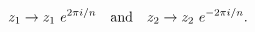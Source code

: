 \begin{equation}  \label{orbifold-twists}
z_1 \to z_1 ~e^{2\pi i/n} \quad {\rm and } \quad z_2 \to
z_2 ~e^{-2\pi i/n}.  
\end{equation}

